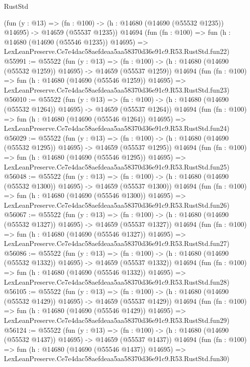 \begin{lexlean}{RustStd}
\begin{coremodule}
    (fun (y : @13) =>
    (fn : @100) -> (h : @14680 (@14690 (@55532 @1235)) @14695) -> @14659 (@55537 @1235))
    @14694
    (fun (fn : @100) =>
    fun (h : @14680 (@14690 (@55546 @1235)) @14695) =>
    LexLeanPreserve.Ce7e4dac58aefdeaa5aa58370d36e91c9.R53.RustStd.fun22)
@55991 := @55522
    (fun (y : @13) =>
    (fn : @100) -> (h : @14680 (@14690 (@55532 @1259)) @14695) -> @14659 (@55537 @1259))
    @14694
    (fun (fn : @100) =>
    fun (h : @14680 (@14690 (@55546 @1259)) @14695) =>
    LexLeanPreserve.Ce7e4dac58aefdeaa5aa58370d36e91c9.R53.RustStd.fun23)
@56010 := @55522
    (fun (y : @13) =>
    (fn : @100) -> (h : @14680 (@14690 (@55532 @1264)) @14695) -> @14659 (@55537 @1264))
    @14694
    (fun (fn : @100) =>
    fun (h : @14680 (@14690 (@55546 @1264)) @14695) =>
    LexLeanPreserve.Ce7e4dac58aefdeaa5aa58370d36e91c9.R53.RustStd.fun24)
@56029 := @55522
    (fun (y : @13) =>
    (fn : @100) -> (h : @14680 (@14690 (@55532 @1295)) @14695) -> @14659 (@55537 @1295))
    @14694
    (fun (fn : @100) =>
    fun (h : @14680 (@14690 (@55546 @1295)) @14695) =>
    LexLeanPreserve.Ce7e4dac58aefdeaa5aa58370d36e91c9.R53.RustStd.fun25)
@56048 := @55522
    (fun (y : @13) =>
    (fn : @100) -> (h : @14680 (@14690 (@55532 @1300)) @14695) -> @14659 (@55537 @1300))
    @14694
    (fun (fn : @100) =>
    fun (h : @14680 (@14690 (@55546 @1300)) @14695) =>
    LexLeanPreserve.Ce7e4dac58aefdeaa5aa58370d36e91c9.R53.RustStd.fun26)
@56067 := @55522
    (fun (y : @13) =>
    (fn : @100) -> (h : @14680 (@14690 (@55532 @1327)) @14695) -> @14659 (@55537 @1327))
    @14694
    (fun (fn : @100) =>
    fun (h : @14680 (@14690 (@55546 @1327)) @14695) =>
    LexLeanPreserve.Ce7e4dac58aefdeaa5aa58370d36e91c9.R53.RustStd.fun27)
@56086 := @55522
    (fun (y : @13) =>
    (fn : @100) -> (h : @14680 (@14690 (@55532 @1332)) @14695) -> @14659 (@55537 @1332))
    @14694
    (fun (fn : @100) =>
    fun (h : @14680 (@14690 (@55546 @1332)) @14695) =>
    LexLeanPreserve.Ce7e4dac58aefdeaa5aa58370d36e91c9.R53.RustStd.fun28)
@56105 := @55522
    (fun (y : @13) =>
    (fn : @100) -> (h : @14680 (@14690 (@55532 @1429)) @14695) -> @14659 (@55537 @1429))
    @14694
    (fun (fn : @100) =>
    fun (h : @14680 (@14690 (@55546 @1429)) @14695) =>
    LexLeanPreserve.Ce7e4dac58aefdeaa5aa58370d36e91c9.R53.RustStd.fun29)
@56124 := @55522
    (fun (y : @13) =>
    (fn : @100) -> (h : @14680 (@14690 (@55532 @1437)) @14695) -> @14659 (@55537 @1437))
    @14694
    (fun (fn : @100) =>
    fun (h : @14680 (@14690 (@55546 @1437)) @14695) =>
    LexLeanPreserve.Ce7e4dac58aefdeaa5aa58370d36e91c9.R53.RustStd.fun30)

\end{coremodule}
\end{lexlean}
